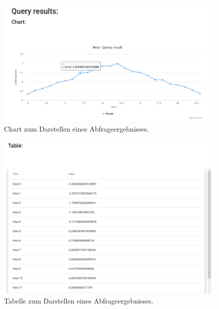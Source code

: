 \documentclass[12pt, letterpaper]{article}
\begin{document}
\begin{figure}[H]
    \centering
    \includegraphics[width=\textwidth]{img/query/query_chart.png}
    \caption{Chart zum Darstellen eines Abfrageergebnisses.}
    \label{fig:query_chart}
\end{figure}

\begin{figure}[H]
    \centering
    \includegraphics[width=\textwidth]{img/query/query_table.png}
    \caption{Tabelle zum Darstellen eines Abfrageergebnisses.}
    \label{fig:query_table}
\end{figure}
\end{document}
